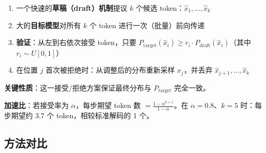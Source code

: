 \begin{keybox}[投机解码框架]
\begin{enumerate}
  \item 一个快速的\textbf{草稿（draft）机制}提议 $k$ 个候选 token：$\hat{x}_1, \ldots, \hat{x}_k$
  \item 大的\textbf{目标模型}对所有 $k$ 个 token 进行一次（批量）前向传递
  \item \textbf{验证}：从左到右依次接受 token，只要 $P_{\text{target}}(\hat{x}_i) \geq r_i \cdot P_{\text{draft}}(\hat{x}_i)$（其中 $r_i \sim U[0,1]$）
  \item 在位置 $j$ 首次被拒绝时：从调整后的分布重新采样 $x_j$，并丢弃 $\hat{x}_{j+1}, \ldots, \hat{x}_k$
\end{enumerate}

\textbf{关键性质}：这一接受/拒绝方案保证最终分布与 $P_{\text{target}}$ 完全一致。

\textbf{加速比}：若接受率为 $\alpha$，每步期望 token 数 $= \frac{1 - \alpha^{k+1}}{1 - \alpha}$。在 $\alpha=0.8$、$k=5$ 时：每步期望约 3.7 个 token，相较标准解码的 1 个。
\end{keybox}

\subsection{方法对比}
\label{methods-comparison}

